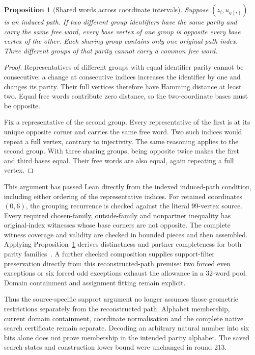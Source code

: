 \documentclass[11pt,a4paper]{article}
\newtheorem{proposition}[theorem]{Proposition}
\theoremstyle{definition}
\theoremstyle{remark}
\begin{document}
\begin{proposition}[Shared words across coordinate intervals]\label{prop:interval213}
Suppose $(z_i,u_{g(i)})$ is an induced path. If two different group
identifiers have the same parity and carry the same free word, every
base vertex of one group is opposite every base vertex of the other.
Each sharing group contains only one original path index. Three
different groups of that parity cannot carry a common free word.
\end{proposition}
\begin{proof}
Representatives of different groups with equal identifier parity cannot
be consecutive: a change at consecutive indices increases the identifier
by one and changes its parity. Their full vertices therefore have Hamming
distance at least two. Equal free words contribute zero distance, so the
two-coordinate bases must be opposite.

Fix a representative of the second group. Every representative of the
first is at its unique opposite corner and carries the same free word.
Two such indices would repeat a full vertex, contrary to injectivity.
The same reasoning applies to the second group. With three sharing
groups, being opposite twice makes the first and third bases equal.
Their free words are also equal, again repeating a full vertex.
\end{proof}

This argument has passed Lean directly from the indexed induced-path
condition, including either ordering of the representative indices.
For retained coordinates $(0,6)$, the grouping recurrence is checked
against the literal 99-vertex source. Every required chosen-family,
outside-family and nonpartner inequality has original-index witnesses
whose base corners are not opposite. The complete witness coverage
and validity are checked in bounded pieces and then assembled.
Applying Proposition~\ref{prop:interval213} derives distinctness and
partner completeness for both parity families~\cite{research213}.
A further checked composition supplies support-filter preservation
directly from this reconstructed-path premise: two forced even
exceptions or six forced odd exceptions exhaust the allowance in a
32-word pool. Domain containment and assignment fitting remain explicit.

Thus the source-specific support argument no longer assumes those
geometric restrictions separately from the reconstructed path.
Alphabet membership, current domain containment, coordinate
normalisation and the complete native search certificate remain separate.
Decoding an arbitrary natural number into six bits alone does not prove
membership in the intended parity alphabet. The saved search states and
construction lower bound were unchanged in round 213.
\end{document}
